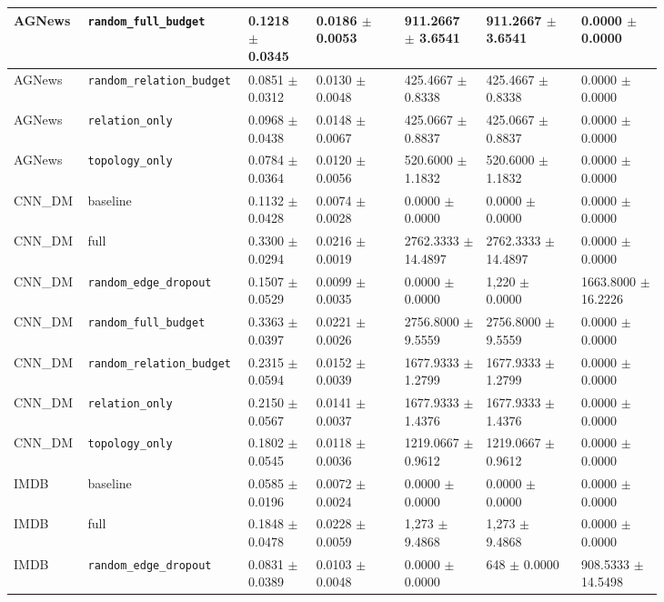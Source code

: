 \documentclass[preprint,12pt]{elsarticle}
\begin{document}
\begin{landscape}
\begin{longtable}{|L{0.07\linewidth}|L{0.15\linewidth}|C{0.10\linewidth}|C{0.13\linewidth}|C{0.12\linewidth}|C{0.14\linewidth}|C{0.12\linewidth}|}
AGNews & \nolinkurl{random_full_budget} & 0.1218 $\pm$ 0.0345 & 0.0186 $\pm$ 0.0053 & 911.2667 $\pm$ 3.6541 & 911.2667 $\pm$ 3.6541 & 0.0000 $\pm$ 0.0000 \\ \hline
AGNews & \nolinkurl{random_relation_budget} & 0.0851 $\pm$ 0.0312 & 0.0130 $\pm$ 0.0048 & 425.4667 $\pm$ 0.8338 & 425.4667 $\pm$ 0.8338 & 0.0000 $\pm$ 0.0000 \\ \hline
AGNews & \nolinkurl{relation_only} & 0.0968 $\pm$ 0.0438 & 0.0148 $\pm$ 0.0067 & 425.0667 $\pm$ 0.8837 & 425.0667 $\pm$ 0.8837 & 0.0000 $\pm$ 0.0000 \\ \hline
AGNews & \nolinkurl{topology_only} & 0.0784 $\pm$ 0.0364 & 0.0120 $\pm$ 0.0056 & 520.6000 $\pm$ 1.1832 & 520.6000 $\pm$ 1.1832 & 0.0000 $\pm$ 0.0000 \\ \hline
CNN\_DM & baseline & 0.1132 $\pm$ 0.0428 & 0.0074 $\pm$ 0.0028 & 0.0000 $\pm$ 0.0000 & 0.0000 $\pm$ 0.0000 & 0.0000 $\pm$ 0.0000 \\ \hline
CNN\_DM & full & 0.3300 $\pm$ 0.0294 & 0.0216 $\pm$ 0.0019 & 2762.3333 $\pm$ 14.4897 & 2762.3333 $\pm$ 14.4897 & 0.0000 $\pm$ 0.0000 \\ \hline
CNN\_DM & \nolinkurl{random_edge_dropout} & 0.1507 $\pm$ 0.0529 & 0.0099 $\pm$ 0.0035 & 0.0000 $\pm$ 0.0000 & 1,220 $\pm$ 0.0000 & 1663.8000 $\pm$ 16.2226 \\ \hline
CNN\_DM & \nolinkurl{random_full_budget} & 0.3363 $\pm$ 0.0397 & 0.0221 $\pm$ 0.0026 & 2756.8000 $\pm$ 9.5559 & 2756.8000 $\pm$ 9.5559 & 0.0000 $\pm$ 0.0000 \\ \hline
CNN\_DM & \nolinkurl{random_relation_budget} & 0.2315 $\pm$ 0.0594 & 0.0152 $\pm$ 0.0039 & 1677.9333 $\pm$ 1.2799 & 1677.9333 $\pm$ 1.2799 & 0.0000 $\pm$ 0.0000 \\ \hline
CNN\_DM & \nolinkurl{relation_only} & 0.2150 $\pm$ 0.0567 & 0.0141 $\pm$ 0.0037 & 1677.9333 $\pm$ 1.4376 & 1677.9333 $\pm$ 1.4376 & 0.0000 $\pm$ 0.0000 \\ \hline
CNN\_DM & \nolinkurl{topology_only} & 0.1802 $\pm$ 0.0545 & 0.0118 $\pm$ 0.0036 & 1219.0667 $\pm$ 0.9612 & 1219.0667 $\pm$ 0.9612 & 0.0000 $\pm$ 0.0000 \\ \hline
IMDB & baseline & 0.0585 $\pm$ 0.0196 & 0.0072 $\pm$ 0.0024 & 0.0000 $\pm$ 0.0000 & 0.0000 $\pm$ 0.0000 & 0.0000 $\pm$ 0.0000 \\ \hline
IMDB & full & 0.1848 $\pm$ 0.0478 & 0.0228 $\pm$ 0.0059 & 1,273 $\pm$ 9.4868 & 1,273 $\pm$ 9.4868 & 0.0000 $\pm$ 0.0000 \\ \hline
IMDB & \nolinkurl{random_edge_dropout} & 0.0831 $\pm$ 0.0389 & 0.0103 $\pm$ 0.0048 & 0.0000 $\pm$ 0.0000 & 648 $\pm$ 0.0000 & 908.5333 $\pm$ 14.5498 \\ \hline

\end{longtable}
\end{landscape}
\end{document}
